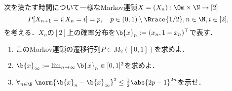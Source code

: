 \documentclass[uplatex,dvipdfmx]{jsarticle}
\begin{document}
\begin{tcolorbox}[colframe=ForestGreen, colback=ForestGreen!10!white,breakable,colbacktitle=ForestGreen!40!white,coltitle=black,fonttitle=\bfseries\sffamily,
    title=第３問]
    次を満たす時間について一様なMarkov連鎖$X=(X_n):\Om\times\N\to[2]$
    \[P[X_{n+1}=i|X_{n}=i]=p,\quad p\in(0,1)\setminus\Brace{1/2},n\in\N,i\in[2],\]
    を考える．$X_n$の$[2]$上の確率分布を$\b{x}_n:=(x_n,1-x_n)^\top$で表す．
    \begin{enumerate}
        \item このMarkov連鎖の遷移行列$P\in M_2([0,1])$を求めよ．
        \item $\b{x}_\infty:=\lim_{n\to\infty}\b{x}_n\in[0,1]^2$を求めよ．
        \item $\forall_{n\in\N}\;\norm{\b{x}_n-\b{x}_\infty}^2\le\frac{1}{2}\abs{2p-1}^{2n}$を示せ．
    \end{enumerate}
\end{tcolorbox}
\end{document}
